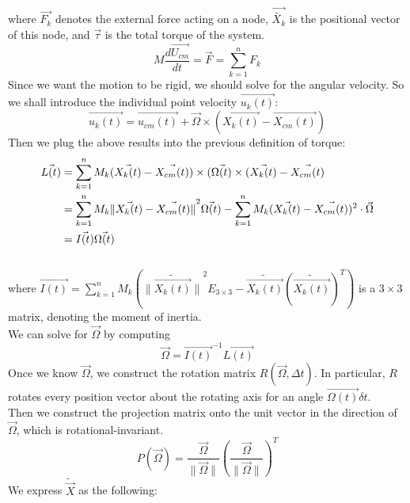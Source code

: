 \documentclass[12pt]{article}
\begin{document}
where $\vec{F_{k}}$ denotes the external force acting on a node, $\vec{\tilde{X_{k}}}$ is the positional vector of this node, and $\vec{\tau}$ is the total torque of the system.\\
\begin{equation}
M\frac{d{\vec{U_{cm}}}}{dt}=\vec{F}=\sum_{k=1}^{n}{F_{k}}
\end{equation}
Since we want the motion to be rigid, we should solve for the angular velocity. So we shall introduce the individual point velocity $\vec{u_{k}(t)}$:\\
\begin{equation}
\vec{u_{k}(t)}=\vec{u_{cm}(t)}+\vec{\Omega}\times(\vec{X_{k}(t)}-\vec{X_{cm}(t)})
\end{equation}
Then we plug the above results into the previous definition of torque:\\
\begin{equation}
\aligned
\vec{L(t)}&=\sum_{k=1}^{n}M_{k}(\vec{X_{k}(t)}-\vec{X_{cm}(t)})\times (\vec{\Omega(t)}\times (\vec{X_{k}(t)}-\vec{X_{cm}(t)}\\
&=\sum_{k=1}^{n}M_{k}{\lVert{\vec{X_{k}(t)}-\vec{X_{cm}(t)}}\rVert}^{2}\vec{\Omega(t)}-\sum_{k=1}^{n}M_{k}(\vec{X_{k}(t)}-\vec{X_{cm}(t)})^{2}\cdot \vec{\Omega}\\
&=\vec{I(t)}\vec{\Omega(t)}
\endaligned
\end{equation}\\
where $\vec{I(t)}=\sum_{k=1}^{n}M_{k}({\lVert{\tilde{\vec{X_{k}(t)}}}\rVert}^{2}E_{3\times3}-\tilde{\vec{X_{k}(t)}}(\tilde{\vec{X_{k}(t)}})^{T})$ is a $3\times3$ matrix, denoting the moment of inertia.\\
We can solve for $\vec{\Omega}$ by computing \\
\begin{equation}
\vec{\Omega}={\vec{I(t)}}^{-1}\vec{L(t)}
\end{equation}
Once we know $\vec{\Omega}$, we construct the rotation matrix $R(\vec{\Omega},\Delta{t})$. In particular, $R$ rotates every position vector about the rotating axis for an angle $\vec{\Omega(t)}\delta{t}$.\\
Then we construct the projection matrix onto the unit vector in the direction of $\vec{\Omega}$, which is rotational-invariant.\\
\begin{equation}
P(\vec{\Omega})=\frac{\vec{\Omega}}{\lVert{\vec{\Omega}}\rVert}(\frac{\vec{\Omega}}{\lVert{\vec{\Omega}}\rVert})^{T}
\end{equation}
We express $\tilde{\vec{X}}$ as the following:
\end{document}
